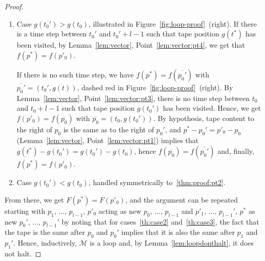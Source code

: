 \begin{proof}
\begin{enumerate}
        \item Case $g(t_0') > g(t_0)$, illustrated in Figure~\ref{fig:loop-proof}~(right). If there is a time step between $t_0'$ and $t_0'+l-1$ such that tape position $g(t^*)$ has been visited, by Lemma~\ref{lem:vector}, Point~\ref{lem:vector:pt4}, we get that $f(p^*) = f(p'_0)$.

              If there is no such time step, we have $f(p^*) = f(\overline{p_0'})$ with $\overline{p_0'} = (t_0',g(t))$, dashed red in Figure~\ref{fig:loop-proof}~(right). By Lemma~\ref{lem:vector}, Point~\ref{lem:vector:pt3}, there is no time step between $t_0$ and $t_0+l-1$ such that tape position $g(t_0')$ has been visited. Hence, we  get $f(p'_0) = f(\overline{p_0})$ with $\overline{p_0} = (t_0,g(t_0'))$. By hypothesis, tape content to the right of $p_0$ is the same as to the right of $p_0'$, and $p^*-p_0' = p'_0 - p_0$ (Lemma~\ref{lem:vector}, Point~\ref{lem:vector:pt1}) implies that $g(t^*)-g(t_0') = g(t_0') - g(t_0)$, hence $f(\overline{p_0}) = f(\overline{p_0'})$ and, finally, $f(p^*) = f(p'_0)$.\label{thm:proof:pt2}
        \item Case $g(t_0') < g(t_0)$, handled symmetrically to~\ref{thm:proof:pt2}.
    \end{enumerate}
    From there, we get $F(p^*) = F(p'_0)$, and the argument can be repeated starting with $p_1,\, \dots,\, p_{l-1},\, p'_0$ acting as new $p_0,\,\dots,\,p_{l-1}$ and $p'_1,\, \dots,\, p_{l-1}',\, p^*$ as new $p_0',\,\dots,\,p_{l-1}'$ by noting that for cases~\ref{th:case2} and~\ref{th:case3}, the fact that the tape is the same after $p_0$ and $p_0'$ implies that it is also the same after $p_1$ and $p_1'$. Hence, inductively, $\mathcal{M}$ is a loop and, by Lemma~\ref{lem:loopdonthalt}, it does not halt.
\end{proof}

